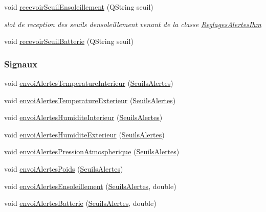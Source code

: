 \begin{DoxyCompactItemize}
void \hyperlink{class_alertes_abf6b9934820f50024c50dc9691f4ddee}{recevoir\+Seuil\+Ensoleillement} (Q\+String seuil)
\begin{DoxyCompactList}\small\item\em slot de reception des seuils d\textquotesingle{}ensoleillement venant de la classe \hyperlink{class_reglages_alertes_ihm}{Reglages\+Alertes\+Ihm} \end{DoxyCompactList}\item 
void \hyperlink{class_alertes_a61e1f4a105bd64ac829959726ae6ebb8}{recevoir\+Seuil\+Batterie} (Q\+String seuil)
\end{DoxyCompactItemize}
\subsubsection*{Signaux}
\begin{DoxyCompactItemize}
\item 
void \hyperlink{class_alertes_a7726d5049a1453b6c22fafb33693bfe9}{envoi\+Alertes\+Temperature\+Interieur} (\hyperlink{parametres_8h_aaa6de8207c94675264c90b10b613368d}{Seuils\+Alertes})
\item 
void \hyperlink{class_alertes_a7b257375a0d8ad5f41abaa572799aae4}{envoi\+Alertes\+Temperature\+Exterieur} (\hyperlink{parametres_8h_aaa6de8207c94675264c90b10b613368d}{Seuils\+Alertes})
\item 
void \hyperlink{class_alertes_a6d96d5a6e5a1e3c518c45e295a5b4ddf}{envoi\+Alertes\+Humidite\+Interieur} (\hyperlink{parametres_8h_aaa6de8207c94675264c90b10b613368d}{Seuils\+Alertes})
\item 
void \hyperlink{class_alertes_a9a4f2ada9fbf4cf505d6d94831d8e413}{envoi\+Alertes\+Humidite\+Exterieur} (\hyperlink{parametres_8h_aaa6de8207c94675264c90b10b613368d}{Seuils\+Alertes})
\item 
void \hyperlink{class_alertes_a3e81bcca9d4c91c69f575546681590bc}{envoi\+Alertes\+Pression\+Atmospherique} (\hyperlink{parametres_8h_aaa6de8207c94675264c90b10b613368d}{Seuils\+Alertes})
\item 
void \hyperlink{class_alertes_a60f823014dcce3504ee1d78ac50b5328}{envoi\+Alertes\+Poids} (\hyperlink{parametres_8h_aaa6de8207c94675264c90b10b613368d}{Seuils\+Alertes})
\item 
void \hyperlink{class_alertes_a578aa70bc7ca4ec753aa7f97e90f7f02}{envoi\+Alertes\+Ensoleillement} (\hyperlink{parametres_8h_aaa6de8207c94675264c90b10b613368d}{Seuils\+Alertes}, double)
\item 
void \hyperlink{class_alertes_a0e81d795f8e7559eab19fcb9be138f5f}{envoi\+Alertes\+Batterie} (\hyperlink{parametres_8h_aaa6de8207c94675264c90b10b613368d}{Seuils\+Alertes}, double)
\end{DoxyCompactItemize}
